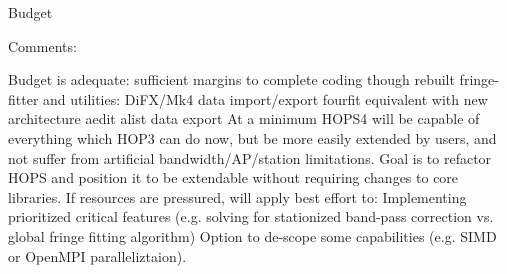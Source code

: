 \documentclass[8pt]{beamer}
\begin{document}
\begin{frame}{Budget}



Comments:
\begin{outline}
    \1 Budget is adequate: sufficient margins to complete coding though rebuilt fringe-fitter and utilities:
        \2 DiFX/Mk4 data import/export
        \2 fourfit equivalent with new architecture
        \2 aedit
        \2 alist
        \2 data export
    \1 At a minimum HOPS4 will be capable of everything which HOP3 can do now, but be more easily extended by users, and not suffer from artificial bandwidth/AP/station limitations. Goal is to refactor HOPS and position it to be extendable without requiring changes to core libraries.
    \1 If resources are pressured, will apply best effort to:
        \2 Implementing prioritized critical features (e.g. solving for stationized band-pass correction vs. global fringe fitting algorithm)
        \2 Option to de-scope some capabilities (e.g. SIMD or OpenMPI paralleliztaion).
\end{outline}

\end{frame}




\end{document}
